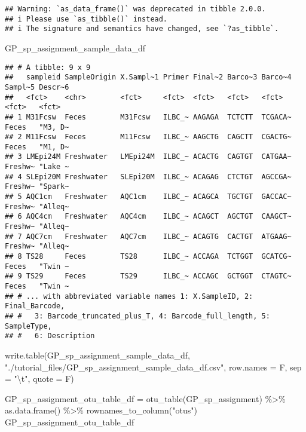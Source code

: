 \documentclass[
]{article}
\newenvironment{Shaded}{\begin{snugshade}}{\end{snugshade}}
\newcommand{\AttributeTok}[1]{\textcolor[rgb]{0.77,0.63,0.00}{#1}}
\newcommand{\FunctionTok}[1]{\textcolor[rgb]{0.00,0.00,0.00}{#1}}
\newcommand{\NormalTok}[1]{#1}
\newcommand{\OtherTok}[1]{\textcolor[rgb]{0.56,0.35,0.01}{#1}}
\newcommand{\SpecialCharTok}[1]{\textcolor[rgb]{0.00,0.00,0.00}{#1}}
\newcommand{\StringTok}[1]{\textcolor[rgb]{0.31,0.60,0.02}{#1}}
\begin{document}
\begin{verbatim}
## Warning: `as_data_frame()` was deprecated in tibble 2.0.0.
## i Please use `as_tibble()` instead.
## i The signature and semantics have changed, see `?as_tibble`.
\end{verbatim}

\begin{Shaded}
\begin{Highlighting}[]
\NormalTok{GP\_sp\_assignment\_sample\_data\_df}
\end{Highlighting}
\end{Shaded}

\begin{verbatim}
## # A tibble: 9 x 9
##   sampleid SampleOrigin X.Sampl~1 Primer Final~2 Barco~3 Barco~4 Sampl~5 Descr~6
##   <fct>    <chr>        <fct>     <fct>  <fct>   <fct>   <fct>   <fct>   <fct>  
## 1 M31Fcsw  Feces        M31Fcsw   ILBC_~ AAGAGA  TCTCTT  TCGACA~ Feces   "M3, D~
## 2 M11Fcsw  Feces        M11Fcsw   ILBC_~ AAGCTG  CAGCTT  CGACTG~ Feces   "M1, D~
## 3 LMEpi24M Freshwater   LMEpi24M  ILBC_~ ACACTG  CAGTGT  CATGAA~ Freshw~ "Lake ~
## 4 SLEpi20M Freshwater   SLEpi20M  ILBC_~ ACAGAG  CTCTGT  AGCCGA~ Freshw~ "Spark~
## 5 AQC1cm   Freshwater   AQC1cm    ILBC_~ ACAGCA  TGCTGT  GACCAC~ Freshw~ "Alleq~
## 6 AQC4cm   Freshwater   AQC4cm    ILBC_~ ACAGCT  AGCTGT  CAAGCT~ Freshw~ "Alleq~
## 7 AQC7cm   Freshwater   AQC7cm    ILBC_~ ACAGTG  CACTGT  ATGAAG~ Freshw~ "Alleq~
## 8 TS28     Feces        TS28      ILBC_~ ACCAGA  TCTGGT  GCATCG~ Feces   "Twin ~
## 9 TS29     Feces        TS29      ILBC_~ ACCAGC  GCTGGT  CTAGTC~ Feces   "Twin ~
## # ... with abbreviated variable names 1: X.SampleID, 2: Final_Barcode,
## #   3: Barcode_truncated_plus_T, 4: Barcode_full_length, 5: SampleType,
## #   6: Description
\end{verbatim}

\begin{Shaded}
\begin{Highlighting}[]
\FunctionTok{write.table}\NormalTok{(GP\_sp\_assignment\_sample\_data\_df, }\StringTok{"./tutorial\_files/GP\_sp\_assignment\_sample\_data\_df.csv"}\NormalTok{,}
            \AttributeTok{row.names =}\NormalTok{ F,}
            \AttributeTok{sep =} \StringTok{"}\SpecialCharTok{\textbackslash{}t}\StringTok{"}\NormalTok{,}
            \AttributeTok{quote =}\NormalTok{ F)}
\end{Highlighting}
\end{Shaded}

\begin{Shaded}
\begin{Highlighting}[]
\NormalTok{GP\_sp\_assignment\_otu\_table\_df }\OtherTok{=} \FunctionTok{otu\_table}\NormalTok{(GP\_sp\_assignment) }\SpecialCharTok{\%\textgreater{}\%} 
  \FunctionTok{as.data.frame}\NormalTok{() }\SpecialCharTok{\%\textgreater{}\%} 
  \FunctionTok{rownames\_to\_column}\NormalTok{(}\StringTok{"otus"}\NormalTok{)}
\NormalTok{GP\_sp\_assignment\_otu\_table\_df}
\end{Highlighting}
\end{Shaded}
\end{document}
